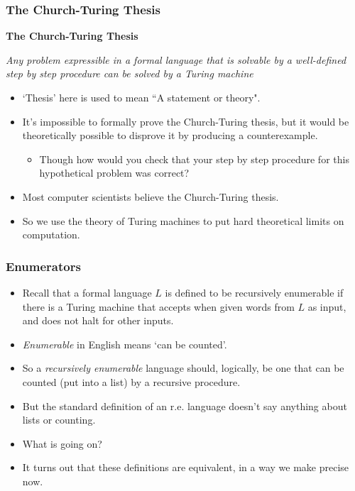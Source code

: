 \documentclass[handout]{beamer}
\begin{document}
\begin{frame}
\frametitle{The Church-Turing Thesis}
\begin{centering} \textbf{The Church-Turing Thesis}

\emph{Any problem expressible in a formal language that is solvable by a well-defined step by step procedure can be solved by a Turing machine} \end{centering}
\newline
\begin{itemize}
\item `Thesis' here is used to mean ``A statement or theory". 
\vspace{0.2cm}
\item It's impossible to formally prove the Church-Turing thesis, but it would be theoretically possible to disprove it by producing a counterexample.
\begin{itemize}
\vspace{0.2cm}
\item Though how would you check that your step by step procedure for this hypothetical problem was correct?
\end{itemize}
\vspace{0.2cm}
\item Most computer scientists believe the Church-Turing thesis.
\vspace{0.2cm}
\item So we use the theory of Turing machines to put hard theoretical limits on computation.
\end{itemize}
\end{frame}

\begin{frame}
\frametitle{Enumerators}
\begin{itemize}
\item Recall that a formal language $L$ is defined to be recursively enumerable if there is a Turing machine that accepts when given words from $L$ as input, and does not halt for other inputs. 
\vspace{0.2cm}
\item \emph{Enumerable} in English means `can be counted'.
\vspace{0.2cm}
\item  So a \emph{recursively enumerable} language should, logically, be one that can be counted (put into a list) by a recursive procedure. 
\vspace{0.2cm}
\item But the standard definition of an r.e. language doesn't say anything about lists or counting.
\vspace{0.2cm}
\item What is going on? 
\vspace{0.2cm}
\item It turns out that these definitions are equivalent, in a way we make precise now.
\end{itemize}

\end{frame}
\end{document}
